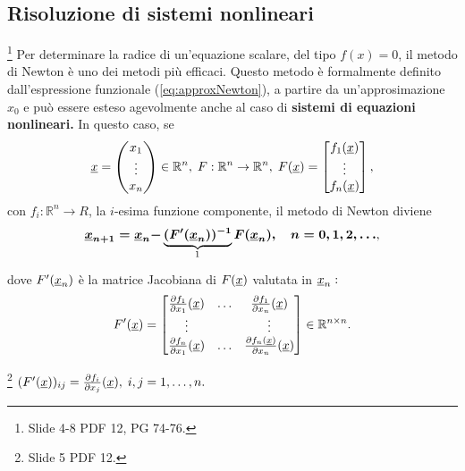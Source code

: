 \subsection{Risoluzione di sistemi nonlineari}\label{ssec:risSistNonLin}\footnote{Slide 4-8 PDF 12, PG 74-76.}
Per determinare la radice di un'equazione scalare, del tipo $f(x)=0$, il metodo di Newton è uno dei metodi più efficaci. Questo metodo è formalmente definito dall'espressione funzionale (\ref{eq:approxNewton}), a partire da un'approsimazione $x_0$ e può essere esteso agevolmente anche al caso di \textbf{sistemi di equazioni nonlineari.} In questo caso, se 
\begin{equation}
    \uline x =
    \begin{pmatrix}
        x_1\\
        \vdots\\
        x_n
    \end{pmatrix}\in\mathbb R^n,\; F:\mathbb R^n\rightarrow\mathbb R^n,\; F(\uline x)=
    \begin{bmatrix}
        f_1(\uline x)\\
        \vdots\\
        f_n(\uline x)
    \end{bmatrix},
\end{equation}
con $f_i:\mathbb R^n\rightarrow R$, la $i$-esima funzione componente, il metodo di Newton diviene 
\begin{equation}\label{eq:newtSistNonLinEq}
    \boldsymbol{\uline x_{n+1} = \uline x_n -} \underbrace{\boldsymbol{(F'(\uline x_n))^{-1}}}_{\footnotemark}\boldsymbol{F(\uline x_n),\quad n=0,1,2,\hdots},
\end{equation}
dove $F'(\uline x_n)$ è la matrice Jacobiana di $F(\uline x)$ valutata in $\uline x_n:$
\begin{equation*}
    F'(\uline x)=
    \begin{bmatrix}
        \frac{\partial f_1}{\partial x_1}(\uline x) & \hdots & \frac{\partial f_1}{\partial x_n}(\uline x)\\
        \vdots & &\vdots\\
        \frac{\partial f_n}{\partial x_1}(\uline x) & \hdots & \frac{\partial f_n(\uline x)}{\partial x_n}(\uline x)
    \end{bmatrix}\in\mathbb R^{n\times n}.
\end{equation*}

\begin{remark}\footnote{Slide 5 PDF 12.}
    $(F'(\uline x))_{ij}=\frac{\partial f_i}{\partial x_j}(\uline x),\; i,j=1,\hdots,n.$
\end{remark}

